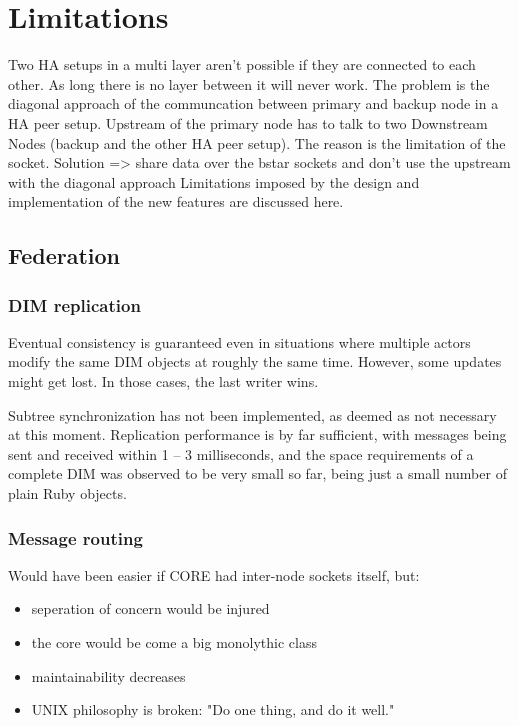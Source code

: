 \section{Limitations}
Two HA setups in a multi layer aren't possible if they are connected to each other. As long there is no
layer between it will never work. The problem is the diagonal approach of the communcation
between primary and backup node in a HA peer setup. Upstream of the primary 
node has to talk to two Downstream Nodes (backup and the other HA peer setup).
The reason is the limitation of the socket.
Solution => share data over the bstar sockets and don't use the upstream with the diagonal approach
%  
Limitations imposed by the design and implementation of the new features are
discussed here.

\subsection{Federation}
\subsubsection{DIM replication}
Eventual consistency is guaranteed even in situations where multiple actors
modify the same DIM objects at roughly the same time. However, some updates
might get lost. In those cases, the last writer wins.


Subtree synchronization has not been implemented, as deemed as not necessary at
this moment. Replication performance is by far sufficient, with messages being
sent and received within 1 -- 3 milliseconds, and the space requirements of a
complete DIM was observed to be very small so far, being just a small number of
plain Ruby objects.

\subsubsection{Message routing}
Would have been easier if CORE had inter-node sockets itself, but: 
\begin{itemize}
	\item seperation of concern would be injured
	\item the core would be come a big monolythic class
	\item maintainability decreases
	\item UNIX philosophy is broken: "Do one thing, and do it well."
\end{itemize}

